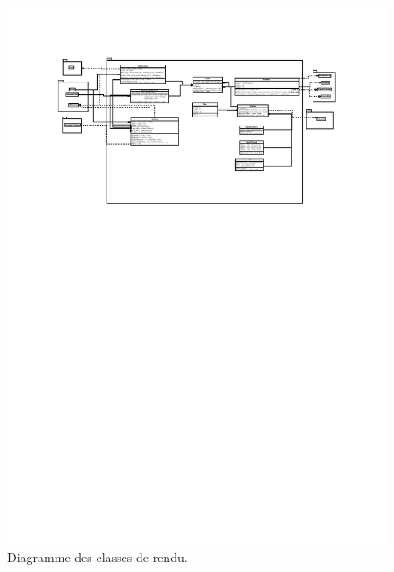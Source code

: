 \documentclass[a4paper,12pt]{article}
\begin{document}
\begin{landscape}
\begin{figure}[p]
\includegraphics[width=0.9\paperheight]{render.pdf}
\caption{\label{uml:render}Diagramme des classes de rendu.} 
\end{figure}
\end{landscape}
\end{document}
